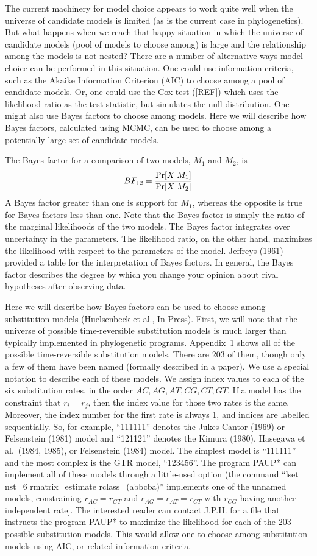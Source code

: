 \documentclass{svmult}
\begin{document}
The current machinery for model choice appears to work quite well when the universe of candidate models is limited (as is the current case
in phylogenetics). But what happens when we reach that happy situation in which the
universe of candidate models (pool of models to choose among) is large and the relationship among the models is not nested? There are a number of alternative
ways model choice can be performed in this situation. One could use information criteria, such as the Akaike Information Criterion (AIC) to choose among a pool
of candidate models. Or, one could use the Cox test ([REF]) which uses the likelihood ratio as the test statistic, but simulates the null distribution. One might also use Bayes factors to choose among models. Here we will describe how Bayes factors, calculated using MCMC, can be used to choose among a potentially large set of candidate models. 

The Bayes factor for a comparison of two models, $M_1$ and $M_2$, is
$$
BF_{12} = {\Pr[X | M_1] \over \Pr[X | M_2]}
$$
A Bayes factor greater than one is support for $M_1$, whereas the opposite is true for Bayes factors less than one. 
Note that the Bayes factor is simply the ratio of the marginal likelihoods of the two models. The Bayes factor integrates over uncertainty in the parameters. The
likelihood ratio, on the other hand, maximizes the likelihood with respect to the parameters of the model. 
Jeffreys (1961) provided a table for the
interpretation of Bayes factors. In general, the Bayes factor describes the degree by which you change your opinion about rival hypotheses after observing data.

Here we will describe how Bayes factors can be used to choose among substitution models (Huelsenbeck et al., In Press). First, we will note that the universe
of possible time-reversible substitution models is much larger than typically implemented in phylogenetic programs. Appendix~1 shows all of the possible time-reversible substitution 
models. There are 203 of them, though only a few of them have been named (formally described in a paper). 
We use a special notation to describe each of these models. 
We assign index values to each of the six substitution rates, in the order 
$AC, AG, AT, CG, CT, GT$. 
If a model has the constraint that $r_i = r_j$, then the 
index value for those two rates is the same. Moreover, the index number for the first rate is always
1, and indices are labelled sequentially. So, for example, ``111111'' denotes the Jukes-Cantor (1969) or Felsenstein
(1981) model and ``121121'' denotes the Kimura (1980), Hasegawa et al.\ (1984, 1985), or Felsenstein (1984) model. 
The simplest model is ``111111'' and the most complex is the GTR model, ``123456''. 
The program PAUP* can implement all of these
models through a little-used option 
(the command ``lset nst=6 rmatrix=estimate rclass=(abbcba)''  implements one of the unnamed models, 
constraining $r_{AC} = r_{GT}$ and $r_{AG} = r_{AT} = r_{CT}$ with $r_{CG}$ having another independent rate]. The interested reader can contact J.P.H. for a file
that instructs the program PAUP* to maximize the likelihood for each of the 203 possible substitution models. This would allow one to choose among
substitution models using AIC, or related information criteria.
\end{document}
